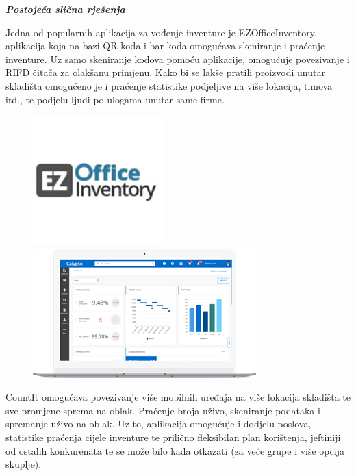 		\large{\textbf{\textit{Postojeća slična rješenja}}}\normalsize
		
		
		Jedna od popularnih aplikacija za vođenje inventure je EZOfficeInventory, aplikacija koja na bazi QR koda i bar koda omogućava skeniranje i praćenje inventure. Uz samo skeniranje kodova pomoću aplikacije, omogućuje povezivanje i RIFD čitača za olakšanu primjenu. Kako bi se lakše pratili proizvodi unutar skladišta omogućeno je i praćenje statistike podjeljive na više lokacija, timova itd., te podjelu ljudi po ulogama unutar same firme.
		
		\begin{figure}[H]
			\includegraphics[height=5cm]{slike/EZ_logo.png}
			\includegraphics[height=5cm]{slike/EZ_slika.png}
			\centering
			\label{ez_logo}
		\end{figure}
		
		
		CountIt omogućava povezivanje više mobilnih uređaja na više lokacija skladišta te sve promjene sprema na oblak. Praćenje broja uživo, skeniranje podataka i spremanje uživo na oblak. Uz to, aplikacija omogućuje i dodjelu poslova, statistike praćenja cijele inventure te prilično fleksibilan plan korištenja, jeftiniji od ostalih konkurenata te se može bilo kada otkazati (za veće grupe i više opcija skuplje).
		
